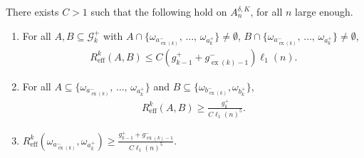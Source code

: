\documentclass[AHL,Unicode,longabstracts,published]{cedram}
\newcommand{\clG}{\mathcal{G}}
\newcommand{\eff}{\mathrm{eff}}
\newcommand\ex{\operatorname{ex}}
\newcommand{\aat}[1]{a_{\ex(#1)}^-}
\newcommand{\bt}[1]{b_{\ex(#1)}^-}
\newcommand{\gtt}[1]{g_{\ex(#1)-1}^-}
\newcommand*{\romanenumi}{\renewcommand*{\theenumi}{\roman{enumi}}}
\begin{document}
\begin{lemm}\label{lem:R_bounds}
There exists $C>1$ such that the following hold on $A_n^{\delta,K}$, for all $n$ large enough.
\begin{enumerate}\romanenumi
\item\label{lemm3.2.1} For all $A,B\subseteq\clG_k^+$ with $A\cap \{\omega_{\aat{k}},\,\dots,\,\omega_{a_k^+}\}\neq\emptyset$, $B\cap \{\omega_{\aat{k}},\,\dots,\,\omega_{a_k^+}\}\neq\emptyset$,
\begin{align*}
{R}^k_\eff(A,B)\leq C \left(g_{k-1}^++\gtt{k}\right)\ell_1(n).
\end{align*}
\item\label{lemm3.2.2} For all $A\subseteq\{\omega_{\aat{k}},\,\dots,\,\omega_{a_k^+}\}$ and $B\subseteq \{\omega_{\bt{k}},\omega_{b_k^+}\}$,
\begin{align*}
{R}^k_\eff(A,B)\geq \frac{g_k^+}{C\ell_1(n)^5}.
\end{align*}
\item\label{lemm3.2.3} ${R}^k_\eff(\omega_{\aat{k}},\omega_{a_k^+})\geq \frac{g_{k-1}^++\gtt{k}}{C\ell_1(n)^5}$.
\end{enumerate}
\end{lemm}
\end{document}

